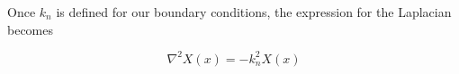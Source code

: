 Once $k_{n}$ is defined for our boundary conditions, the expression for the Laplacian becomes

\begin{equation}
    \nabla^2 X(x) = - k_{n}^2  X(x)
    \label{eq: simplified fourier diffusion}
\end{equation}




%
%

